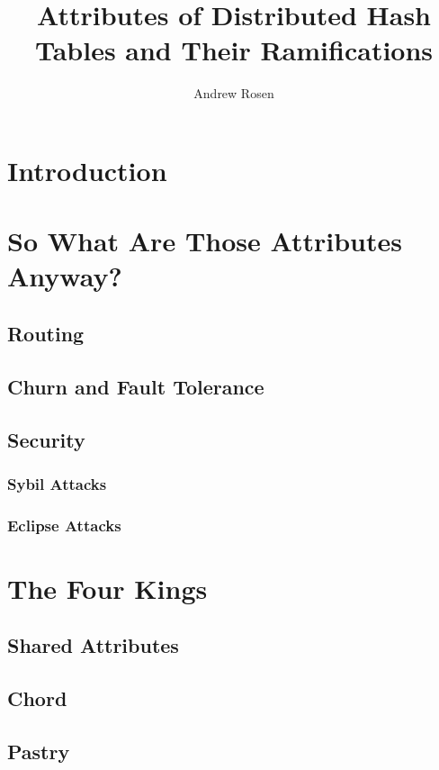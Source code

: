 \documentclass[10pt,letterpaper]{report}
\author{Andrew Rosen}
\title{Attributes of Distributed Hash Tables and Their Ramifications}
\begin{document}
\maketitle


\chapter{Introduction}


\chapter{So What Are Those Attributes Anyway?}


\section{Routing}
\section{Churn and Fault Tolerance}  %
\section{Security}

\subsection{Sybil Attacks}

\subsection{Eclipse Attacks}

\chapter{The Four Kings}%

\section{Shared Attributes}

\section{Chord}

\section{Pastry}
\end{document}
